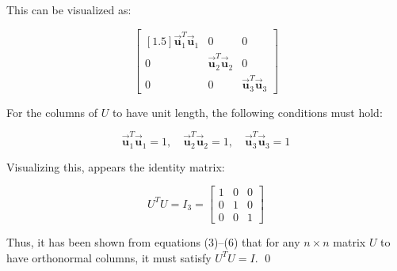 \documentclass[letter,11pt]{article}
\theoremstyle{definition}
\begin{document}
\begin{tcolorbox}[boxrule=1mm,before=\hfill,after=\hfill,adjusted title={Problem 3 solutions}]
This can be visualized as:

\begin{equation}
    \begin{bmatrix}[1.5] \vec{\boldsymbol{u}}_{1}^{T}\vec{\boldsymbol{u}}_{1} & 0 & 0\\ 0 & \vec{\boldsymbol{u}}_{2}^{T}\vec{\boldsymbol{u}}_{2} & 0\\ 0 & 0 & \vec{\boldsymbol{u}}_{3}^{T}\vec{\boldsymbol{u}}_{3} \end{bmatrix}
\end{equation}

For the columns of $U$ to have unit length, the following conditions must hold:

\begin{equation}
    \vec{\boldsymbol{u}}_{1}^{T}\vec{\boldsymbol{u}}_{1} = 1, \quad \vec{\boldsymbol{u}}_{2}^{T}\vec{\boldsymbol{u}}_{2} =1, \quad \vec{\boldsymbol{u}}_{3}^{T}\vec{\boldsymbol{u}}_{3}=1
\end{equation}

Visualizing this, appears the identity matrix:

\begin{equation}
    U^{T}U=I_{3} = \begin{bmatrix} 1 & 0 & 0\\ 0 & 1 & 0\\ 0 & 0 & 1\end{bmatrix}
\end{equation}

Thus, it has been shown from equations (3)–(6) that for any $n\times n$ matrix $U$ to have orthonormal columns, it must satisfy $U^{T}U = I$. \qed
\end{tcolorbox}
\end{document}
